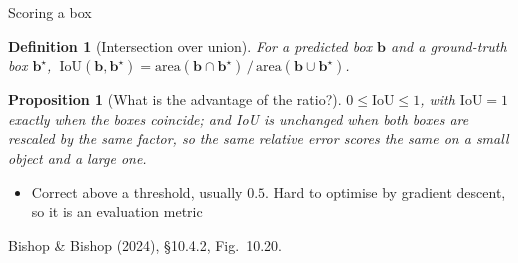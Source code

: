 \documentclass[aspectratio=169, 11pt]{beamer}
\newtheorem{propx}[theorem]{Proposition}
\newtheorem{defx}[theorem]{Definition}
\newcommand{\srcline}[1]{%
  \par\vspace{0.25em}%
  {\scriptsize\color{mcMuted}\hfill #1\par}}
\newcommand{\src}[3]{}      %
\begin{document}
\begin{frame}{Scoring a box}
  \src{bishop2024}{section}{10.4.2}
  \vspace{-0.3em}
  \begin{defx}[Intersection over union]\label{th:iou}
    \small
    For a predicted box $\mathbf{b}$ and a ground-truth box $\mathbf{b}^\star$,
    $\ \mathrm{IoU}(\mathbf{b}, \mathbf{b}^\star) =
      \mathrm{area}(\mathbf{b} \cap \mathbf{b}^\star)\,/\,
      \mathrm{area}(\mathbf{b} \cup \mathbf{b}^\star)$.
  \end{defx}
  \vspace{-0.3em}
  \begin{propx}[What is the advantage of the ratio?]\label{th:iouprop}
    \small
    $0 \leq \mathrm{IoU} \leq 1$, with $\mathrm{IoU} = 1$ exactly when
    the boxes coincide; and IoU is unchanged when both boxes are
    rescaled by the same factor, so the same relative error scores the
    same on a small object and a large one.
  \end{propx}
  \vspace{-0.15em}
  {\footnotesize
  \begin{itemize}\itemsep0.1em
    \item Correct above a threshold, usually $0.5$. Hard to optimise by
          gradient descent, so it is an \alert{evaluation} metric
  \end{itemize}}
  \vspace{-0.3em}
  \srcline{Bishop \& Bishop (2024), \S10.4.2, Fig.~10.20.}
\end{frame}

\end{document}
